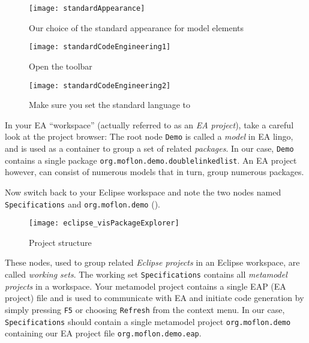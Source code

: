 \begin{figure}[htbp]
  \centering
  \texttt{[image: standardAppearance]}
  \caption{Our choice of the standard appearance for model elements}
  \label{ea:standardAppearanceEA}
\end{figure}

\begin{figure}[htbp]
    \centering
    \texttt{[image: standardCodeEngineering1]}
    \caption{Open the  toolbar}
    \label{ea:standardSCEEA1}
 \end{figure}

\begin{figure}[htbp]
    \centering
    \texttt{[image: standardCodeEngineering2]}
    \caption{Make sure you set the standard language to }
    \label{ea:standardSCEEA2}
 \end{figure}
 
\clearpage

In your EA \enquote{workspace} (actually referred to as an \emph{EA project}), take a careful look at the project browser:
The root node \texttt{Demo} is called a \emph{model} in EA lingo, and is used as a container to group a set of related \emph{packages}.
In our case, \texttt{Demo} contains a single package \texttt{org.moflon.demo.doublelinkedlist}.
An EA project however, can consist of numerous models that in turn, group numerous packages.

Now switch back to your Eclipse workspace and note the two nodes named \texttt{Specifications} and \texttt{org.moflon.demo} ().

\begin{figure}[htbp]
    \centering
    \texttt{[image: eclipse\_visPackageExplorer]}
    \caption{Project structure}
    \label{eclipse:eclipsePS}
 \end{figure}

These nodes, used to group related \emph{Eclipse projects} in an Eclipse workspace, are called \emph{working sets}. The working set
\texttt{Spe\-ci\-fi\-ca\-tions} contains all \emph{metamodel projects} in a  workspace. Your metamodel project contains a single EAP (EA project) file and is
used to communicate with EA and initiate code generation by simply pressing \texttt{F5} or choosing \texttt{Refresh} from the context menu. In our case,
\texttt{Specifications} should contain a single metamodel project \texttt{org.moflon.demo} containing our EA project file \texttt{org.moflon.demo.eap}.
 
